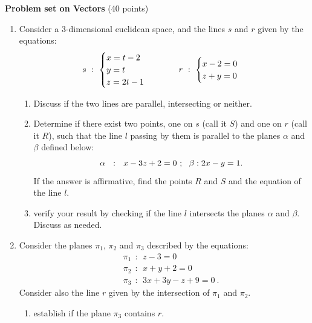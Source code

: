 \documentclass[fleqn]{article}
\begin{document}

\textbf{Problem set on Vectors} (40 points)

\begin{enumerate}
  \item  Consider a 3-dimensional euclidean space, and the lines $s$ and $r$ given by the equations: 
    $$
    s~: ~ \begin{cases}
    x = t - 2 \\
    y=t \\ 
    z=2t-1 \\
    \end{cases} \hskip 1truecm r~: ~ \begin{cases}
      x-2=0 \\
      z+y=0 \\
    \end{cases}
    $$
    \begin{enumerate}
    \item Discuss if the two lines are parallel, intersecting or neither. 


    \item Determine if there exist two points, one on $s$ (call it $S$) and one on $r$ (call it $R$), such that the line $l$ passing by them is parallel to the planes $\alpha$ and $\beta$ defined below: 
    $$
    \alpha ~~:~~ x - 3z + 2 = 0 ~;\\
    ~~\beta : 2x - y = 1.
    $$
    If the answer is affirmative, find the points $R$ and $S$  and the equation of the line $l$. 

    \item verify your result by checking if the line $l$  intersects the planes $\alpha$ and $\beta$.  Discuss as needed. 
    \end{enumerate}

  \item Consider the planes $\pi_1$, $\pi_2$ and $\pi_3$ described by the equations: 
    \begin{eqnarray}
    &&\pi_1 ~~ :~~ z-3=0 \nonumber \\
    &&\pi_2 ~~ :~~ x+y+2=0 \nonumber \\
    &&\pi_3 ~~ :~~ 3x+3y-z+9=0 ~.\nonumber 
    \end{eqnarray}
    Consider also the line $r$ given by the intersection of $\pi_1$ and $\pi_2$. 
    \begin{enumerate}

    \item establish if the plane $\pi_3$ contains $r$. 


\end{enumerate}
\end{enumerate}
\end{document}
